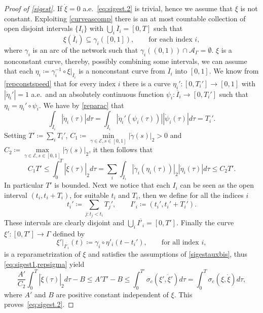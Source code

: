 \documentclass[11pt,a4paper,american]{article}
\newcommand{\Acal}{\mathcal A}
\newcommand{\Ecal}{\mathcal E}
\newcommand{\ovI}{\overline I}
\begin{document}
    \begin{proof}[Proof of \cref{sigest}]
        If $\dot\xi=0$ a.e.\ \cref{eq:sigest.2} is trivial, hence we assume that $\xi$ is not constant. Exploiting \cref{curveascomp} there is an at most countable collection of open disjoint intervals $\{I_i\}$ with $\bigcup_i\ovI_i=[0,T]$ such that
        \begin{equation*}
            \xi\left(\ovI_i\right)\subseteq\gamma_i([0,1]),\qquad\text{for each index }i,
        \end{equation*}
        where $\gamma_i$ is an arc of the network such that $\gamma_i((0,1))\cap\Acal_\Gamma=\emptyset$. $\xi$ is a nonconstant curve, thereby, possibly combining some intervals, we can assume that each $\eta_i\coloneqq\gamma_i^{-1}\circ\xi|_{\ovI_i}$ is a nonconstant curve from $\ovI_i$ into $[0,1]$. We know from \cref{repconstspeed} that for every index $i$ there is a curve $\eta_i':[0,T_i']\to[0,1]$ with $|\dot\eta_i'|=1$ a.e.\ and an absolutely continuous function $\psi_i:\ovI_i\to[0,T_i']$ such that $\eta_i=\eta_i'\circ\psi_i$. We have by \cref{reparac} that
        \begin{equation*}
            \int_{\ovI_i}|\dot\eta_i(\tau)|d\tau=\int_{\ovI_i}\left|\dot\eta_i'(\psi_i(\tau))\right|\left|\dot\psi_i(\tau)\right|d\tau=T_i'.
        \end{equation*}
        Setting $T'\coloneqq\sum_i T_i'$, $C_1\coloneqq\min\limits_{\gamma\in\Ecal,s\in[0,1]}|\dot\gamma(s)|_2>0$ and $C_2\coloneqq\max\limits_{\gamma\in\Ecal,s\in[0,1]}|\dot\gamma(s)|_2$, it then follows that
        \begin{equation}\label{eq:sigest1}
            C_1T'\le\int_0^T\left|\dot\xi(\tau)\right|_2d\tau=\sum_i\int_{\ovI_i}|\dot\gamma_i(\eta_i(\tau))|_2|\dot\eta_i(\tau)|d\tau\le C_2T'.
        \end{equation}
        In particular $T'$ is bounded. Next we notice that each $I_i$ can be seen as the open interval $(t_i,t_i+T_i)$, for suitable $t_i$ and $T_i$, then we define for all the indices $i$
        \begin{equation*}
            t_i'\coloneqq\sum_{j:t_j<t_i}T_j',\qquad I'_i\coloneqq\left(t_i',t_i'+T_i'\right).
        \end{equation*}
        These intervals are clearly disjoint and $\bigcup_i\overline{I'_i}=[0,T']$. Finally the curve $\xi':[0,T']\to\Gamma$ defined by
        \begin{equation*}
            \xi'|_{\overline{I'_i}}(t)\coloneqq\gamma_i\circ\eta'_i\left(t-t_i'\right),\qquad\text{for all index }i,
        \end{equation*}
        is a reparametrization of $\xi$ and satisfies the assumptions of \cref{sigestauxbis}, thus \cref{eq:sigest1,repsigma} yield
        \begin{equation*}
            \frac{A'}{C_2}\int_0^T\left|\dot\xi(\tau)\right|_2d\tau-B\le A'T'-B\le\int_0^{T'}\sigma_c\left(\xi',\dot\xi'\right)d\tau=\int_0^T\sigma_c\left(\xi,\dot\xi\right)d\tau,
        \end{equation*}
        where $A'$ and $B$ are positive constant independent of $\xi$. This proves~\cref{eq:sigest.2}.
    \end{proof}
\end{document}
